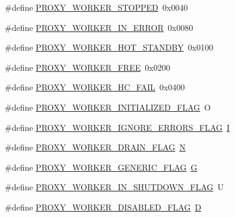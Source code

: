 \begin{DoxyCompactItemize}
\item 
\#define \hyperlink{group__MOD__PROXY_ga2d333edc1554aebdd43ce5446324a169}{P\+R\+O\+X\+Y\+\_\+\+W\+O\+R\+K\+E\+R\+\_\+\+S\+T\+O\+P\+P\+ED}~0x0040
\item 
\#define \hyperlink{group__MOD__PROXY_ga3740b5034be492dab23f0497bfbf6355}{P\+R\+O\+X\+Y\+\_\+\+W\+O\+R\+K\+E\+R\+\_\+\+I\+N\+\_\+\+E\+R\+R\+OR}~0x0080
\item 
\#define \hyperlink{group__MOD__PROXY_ga6a3f52e33bd6370033907db181d9580a}{P\+R\+O\+X\+Y\+\_\+\+W\+O\+R\+K\+E\+R\+\_\+\+H\+O\+T\+\_\+\+S\+T\+A\+N\+D\+BY}~0x0100
\item 
\#define \hyperlink{group__MOD__PROXY_gada2f477fc3ccb487e1fca5179f807f9b}{P\+R\+O\+X\+Y\+\_\+\+W\+O\+R\+K\+E\+R\+\_\+\+F\+R\+EE}~0x0200
\item 
\#define \hyperlink{group__MOD__PROXY_ga38883726b0557a5c85eb36e344935440}{P\+R\+O\+X\+Y\+\_\+\+W\+O\+R\+K\+E\+R\+\_\+\+H\+C\+\_\+\+F\+A\+IL}~0x0400
\item 
\#define \hyperlink{group__MOD__PROXY_ga7ac393a031c94e551a72bedfdb999f9c}{P\+R\+O\+X\+Y\+\_\+\+W\+O\+R\+K\+E\+R\+\_\+\+I\+N\+I\+T\+I\+A\+L\+I\+Z\+E\+D\+\_\+\+F\+L\+AG}~\textquotesingle{}O\textquotesingle{}
\item 
\#define \hyperlink{group__MOD__PROXY_ga562bdc5fc3de4c92edb7438d6ae30ea9}{P\+R\+O\+X\+Y\+\_\+\+W\+O\+R\+K\+E\+R\+\_\+\+I\+G\+N\+O\+R\+E\+\_\+\+E\+R\+R\+O\+R\+S\+\_\+\+F\+L\+AG}~\textquotesingle{}\hyperlink{apr__md5_8c_ac0eafdc9ee161b71e7af98af736952fd}{I}\textquotesingle{}
\item 
\#define \hyperlink{group__MOD__PROXY_ga220f31a57e78ccb8a073f688c0dbe854}{P\+R\+O\+X\+Y\+\_\+\+W\+O\+R\+K\+E\+R\+\_\+\+D\+R\+A\+I\+N\+\_\+\+F\+L\+AG}~\textquotesingle{}\hyperlink{pcregrep_8txt_a0513277caa5c1730b9f0e841fd4c30fc}{N}\textquotesingle{}
\item 
\#define \hyperlink{group__MOD__PROXY_ga36d2d04417d0dae998d7e435cc92962b}{P\+R\+O\+X\+Y\+\_\+\+W\+O\+R\+K\+E\+R\+\_\+\+G\+E\+N\+E\+R\+I\+C\+\_\+\+F\+L\+AG}~\textquotesingle{}\hyperlink{apr__md5_8c_ad96b7cf3182ce2ba85e5a7a93b12c441}{G}\textquotesingle{}
\item 
\#define \hyperlink{group__MOD__PROXY_ga930bbb50085bab5523b3458333cf9452}{P\+R\+O\+X\+Y\+\_\+\+W\+O\+R\+K\+E\+R\+\_\+\+I\+N\+\_\+\+S\+H\+U\+T\+D\+O\+W\+N\+\_\+\+F\+L\+AG}~\textquotesingle{}U\textquotesingle{}
\item 
\#define \hyperlink{group__MOD__PROXY_ga269d797dab452795ce0b8314aed2b4b2}{P\+R\+O\+X\+Y\+\_\+\+W\+O\+R\+K\+E\+R\+\_\+\+D\+I\+S\+A\+B\+L\+E\+D\+\_\+\+F\+L\+AG}~\textquotesingle{}\hyperlink{pcretest_8txt_af3fdb9c275fcc532c7a84dc9c7150523}{D}\textquotesingle{}

\end{DoxyCompactItemize}
